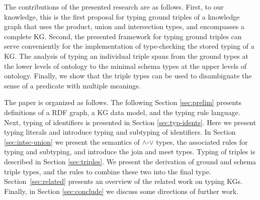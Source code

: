 \documentclass[runningheads]{llncs}
\newcommand{\memo}[1]{}
\begin{document}
The contributions of the presented research are as follows. First, to
our knowledge, this is the first proposal for typing ground triples of
a knowledge graph that uses the product, union and intersection types,
and encompasses a complete KG. Second, the presented framework for
typing ground triples can serve conveniently for the implementation of
type-checking the stored typing of a KG. The analysis of typing an
individual triple spans from the ground types at the lower levels of
ontology to the minimal schema types at the upper levels of
ontology. Finally, we show that the triple types can be used to
disambiguate the sense of a predicate with multiple meanings.

The paper is organized as follows. The following Section
\ref{sec:prelim} presents definitions of a RDF graph, a KG data model,
and the typing rule language. Next, typing of identifiers is presented
in Section \ref{sec:typ-idents}. Here we present typing literals and
introduce typing and subtyping of identifiers. In Section
\ref{sec:intsc-union} we present the semantics of $\land$-$\lor$
types, the associated rules for typing and subtyping, and introduce
the join and meet types. Typing of triples is described in Section
\ref{sec:triples}. We present the derivation of ground and schema
triple types, and the rules to combine these two into the final
type. Section~\ref{sec:related} presents an overview of the related
work on typing KGs. Finally, in Section \ref{sec:conclude} we discuss
some directions of further work. 


\memo{
Typing a knowledge graph requires a framework for the definition of
rules, which is different from the framework for classical typing of
programming languages. While typing in programming languages is based
on the syntactical composition of a program, a knowledge graph is
built from simple triples. Triples can form rich semantic structures
depending on the kinds of entities and values. The kind of object,
for example, can be either a ground value or a class. Typing of a KG
must, therefore, be able to grasp the kinds of objects in the rules,
and, in many cases, need to be guided by a procedure.}
\end{document}
